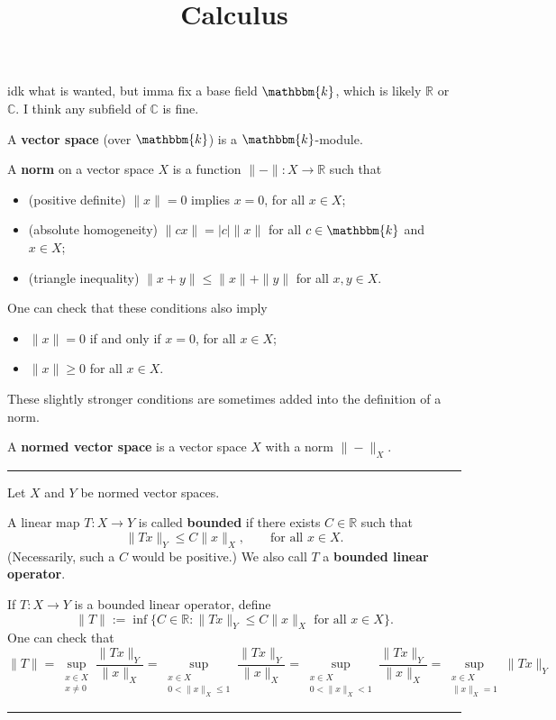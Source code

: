 \documentclass[12pt]{article}
\title{Calculus \\
    \large 
}
\author{}
\date{}
\newcommand{\keyword}[1]{\textbf{#1}}
\newcommand{\sepline}{\rule{\textwidth}{0.4pt}}
\theoremstyle{definition}
\newcommand{\R}{\mathbb{R}}
\newcommand{\C}{\mathbb{C}}
\renewcommand{\k}{\mathbbm{k}}
\newcommand{\<}{\left\langle}
\renewcommand{\>}{\right\rangle}
\begin{document}
idk what is wanted, but imma fix a base field $\k$, which is likely $\R$ or $\C$.
I think any subfield of $\C$ is fine.

A \keyword{vector space} (over $\k$) is a $\k$-module.

A \keyword{norm} on a vector space $X$ is a function $\|{-}\| : X \to \R$ such that
\begin{itemize}
    \item (positive definite) $\|x\| = 0$ implies $x = 0$, for all $x \in X$;
    \item (absolute homogeneity) $\|cx\| = |c| \|x\|$ for all $c \in \k$ and $x \in X$;
    \item (triangle inequality) $\|x + y\| \leq \|x\| + \|y\|$ for all $x, y \in X$.
\end{itemize}

One can check that these conditions also imply
\begin{itemize}
    \item $\|x\| = 0$ if and only if $x = 0$, for all $x \in X$;
    \item $\|x\| \geq 0$ for all $x \in X$.
\end{itemize}
These slightly stronger conditions are sometimes added into the definition of a norm.

A \keyword{normed vector space} is a vector space $X$ with a norm $\|{-}\|_X$.

\sepline

Let $X$ and $Y$ be normed vector spaces.

A linear map $T : X \to Y$ is called \keyword{bounded} if there exists $C \in \R$ such that
\[
    \|Tx\|_Y \leq C\|x\|_X, \qquad \text{for all } x \in X.
\]
(Necessarily, such a $C$ would be positive.)
We also call $T$ a \keyword{bounded linear operator}.

If $T : X \to Y$ is a bounded linear operator, define
\[
    \|T\| := \inf\{C \in \R : \|Tx\|_Y \leq C\|x\|_X \text{ for all } x \in X\}.
\]
One can check that
\[
    \|T\|
        = \sup_{\substack{x \in X \\ x \ne 0}} \frac{\|Tx\|_Y}{\|x\|_X}
        = \sup_{\substack{x \in X \\ 0 < \|x\|_X \leq 1}} \frac{\|Tx\|_Y}{\|x\|_X}
        = \sup_{\substack{x \in X \\ 0 < \|x\|_X < 1}} \frac{\|Tx\|_Y}{\|x\|_X}
        = \sup_{\substack{x \in X \\ \|x\|_X = 1}} \|Tx\|_Y
\]

\sepline
\end{document}
